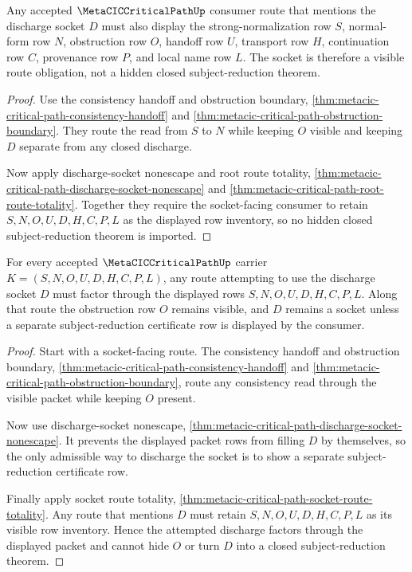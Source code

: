 \begin{theorem}
\label{thm:metacic-critical-path-socket-route-totality}
Any accepted $\MetaCICCriticalPathUp$ consumer route that mentions the
discharge socket $D$ must also display the strong-normalization row $S$,
normal-form row $N$, obstruction row $O$, handoff row $U$, transport row $H$,
continuation row $C$, provenance row $P$, and local name row $L$. The socket is
therefore a visible route obligation, not a hidden closed subject-reduction
theorem.
\end{theorem}
\begin{proof}
Use the consistency handoff and obstruction boundary,
\autoref{thm:metacic-critical-path-consistency-handoff} and
\autoref{thm:metacic-critical-path-obstruction-boundary}. They route the read
from $S$ to $N$ while keeping $O$ visible and keeping $D$ separate from any
closed discharge.

Now apply discharge-socket nonescape and root route totality,
\autoref{thm:metacic-critical-path-discharge-socket-nonescape} and
\autoref{thm:metacic-critical-path-root-route-totality}. Together they require
the socket-facing consumer to retain $S,N,O,U,D,H,C,P,L$ as the displayed row
inventory, so no hidden closed subject-reduction theorem is imported.
\end{proof}

\begin{theorem}
\label{thm:metacic-critical-path-subject-reduction-socket-factorization}
For every accepted $\MetaCICCriticalPathUp$ carrier $K=(S,N,O,U,D,H,C,P,L)$, any route attempting to use the discharge socket $D$ must factor through the displayed rows $S,N,O,U,D,H,C,P,L$. Along that route the obstruction row $O$ remains visible, and $D$ remains a socket unless a separate subject-reduction certificate row is displayed by the consumer.
\end{theorem}
\begin{proof}
Start with a socket-facing route. The consistency handoff and obstruction boundary, \autoref{thm:metacic-critical-path-consistency-handoff} and \autoref{thm:metacic-critical-path-obstruction-boundary}, route any consistency read through the visible packet while keeping $O$ present.

Now use discharge-socket nonescape, \autoref{thm:metacic-critical-path-discharge-socket-nonescape}. It prevents the displayed packet rows from filling $D$ by themselves, so the only admissible way to discharge the socket is to show a separate subject-reduction certificate row.

Finally apply socket route totality, \autoref{thm:metacic-critical-path-socket-route-totality}. Any route that mentions $D$ must retain $S,N,O,U,D,H,C,P,L$ as its visible row inventory. Hence the attempted discharge factors through the displayed packet and cannot hide $O$ or turn $D$ into a closed subject-reduction theorem.
\end{proof}

